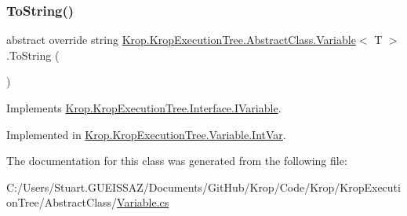 \subsubsection{\texorpdfstring{To\+String()}{ToString()}}
{\footnotesize\ttfamily abstract override string \mbox{\hyperlink{class_krop_1_1_krop_execution_tree_1_1_abstract_class_1_1_variable}{Krop.\+Krop\+Execution\+Tree.\+Abstract\+Class.\+Variable}}$<$ T $>$.To\+String (\begin{DoxyParamCaption}{ }\end{DoxyParamCaption})\hspace{0.3cm}{\ttfamily [pure virtual]}}



Implements \mbox{\hyperlink{interface_krop_1_1_krop_execution_tree_1_1_interface_1_1_i_variable_a4d3f36256ae24e2550ee0a16d3142822}{Krop.\+Krop\+Execution\+Tree.\+Interface.\+I\+Variable}}.



Implemented in \mbox{\hyperlink{class_krop_1_1_krop_execution_tree_1_1_variable_1_1_int_var_acfe213da1e8d6fb0590872d3e7f9195b}{Krop.\+Krop\+Execution\+Tree.\+Variable.\+Int\+Var}}.



The documentation for this class was generated from the following file\+:\begin{DoxyCompactItemize}
\item 
C\+:/\+Users/\+Stuart.\+G\+U\+E\+I\+S\+S\+A\+Z/\+Documents/\+Git\+Hub/\+Krop/\+Code/\+Krop/\+Krop\+Execution\+Tree/\+Abstract\+Class/\mbox{\hyperlink{_variable_8cs}{Variable.\+cs}}\end{DoxyCompactItemize}
